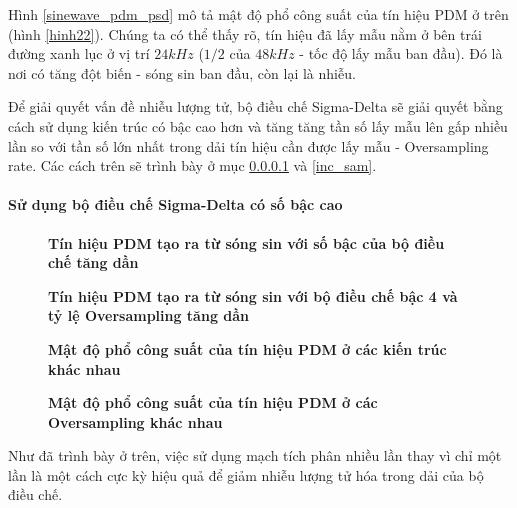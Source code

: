 Hình \ref{sinewave_pdm_psd} mô tả mật độ phổ công suất của tín hiệu PDM ở trên (hình \ref{hinh22}). Chúng ta có thể thấy rõ, tín hiệu đã lấy mẫu nằm ở bên trái đường xanh lục ở vị trí $24kHz$ ($1/2$ của $48kHz$ - tốc độ lấy mẫu ban đầu). Đó là nơi có tăng đột biến - sóng sin ban đầu, còn lại là nhiễu.

Để giải quyết vấn đề nhiễu lượng tử, bộ điều chế Sigma-Delta sẽ giải quyết bằng cách sử dụng kiến trúc có bậc cao hơn và tăng tăng tần số lấy mẫu lên gấp nhiều lần so với tần số lớn nhất trong dải tín hiệu cần được lấy mẫu - Oversampling rate. Các cách trên sẽ trình bày ở mục \ref{inc_order} và \ref{inc_sam}.
\paragraph{Sử dụng bộ điều chế Sigma-Delta có số bậc cao} \label{inc_order}
\begin{figure}
    \centering
    
    \caption[Tín hiệu PDM tạo ra từ sóng sin với số bậc của bộ điều chế tăng dần]{\bfseries \fontsize{12pt}{0pt}\selectfont Tín hiệu PDM tạo ra từ sóng sin với số bậc của bộ điều chế tăng dần}
    \label{sinewave_to_pdm_different_orders}
\end{figure}
\begin{figure}
    \centering
    
    \caption[Tín hiệu PDM tạo ra từ sóng sin với bộ điều chế bậc 4 và tỷ lệ Oversampling tăng dần]{\bfseries \fontsize{12pt}{0pt}\selectfont Tín hiệu PDM tạo ra từ sóng sin với bộ điều chế bậc 4 và tỷ lệ Oversampling tăng dần}
    \label{sinewave_to_pdm_different_osr}
\end{figure}
\begin{figure}
    \centering
    
    \caption[Mật độ phổ công suất của tín hiệu PDM ở các kiến trúc khác nhau]{\bfseries \fontsize{12pt}{0pt}\selectfont Mật độ phổ công suất của tín hiệu PDM ở các kiến trúc khác nhau}
    \label{sinewave_pdm_psd_different_orders}
\end{figure}
\begin{figure}[ht!]
    \centering
    
    \caption[Mật độ phổ công suất của tín hiệu PDM ở các Oversampling khác nhau]{\bfseries \fontsize{12pt}{0pt}\selectfont Mật độ phổ công suất của tín hiệu PDM ở các Oversampling khác nhau}
    \label{sinewave_pdm_psd_different_osr}
\end{figure}
Như đã trình bày ở trên, việc sử dụng mạch tích phân nhiều lần thay vì chỉ một lần là một cách cực kỳ hiệu quả để giảm nhiễu lượng tử hóa trong dải của bộ điều chế.


